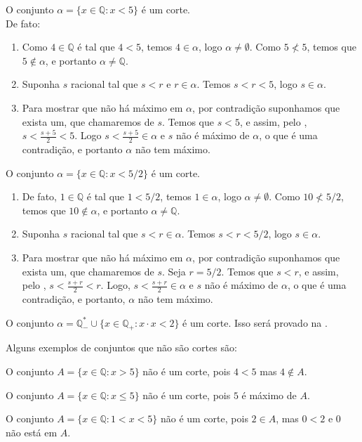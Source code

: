 \documentclass[../main.tex]{subfiles}
\begin{document}
\begin{ex}
    O conjunto $\alpha = \{ x \in \mathbb{Q} : x < 5 \}$ é um corte. \\
    De fato:
    \begin{enumerate}[label=(\roman*)]
        \item Como $4 \in \mathbb{Q}$ é tal que $4 < 5$, temos  $4 \in \alpha$, logo  $ \alpha \neq \emptyset$. Como $5 \not< 5$, temos que $5 \not\in \alpha$, e portanto $\alpha \neq \mathbb{Q}$.
        \item Suponha $s$ racional tal que $s < r$ e $r \in \alpha$. Temos $s < r < 5$, logo $s \in \alpha$.
        \item Para mostrar que não há máximo em $\alpha$, por contradição suponhamos que exista um, que chamaremos de $s$. Temos que $s < 5$, e assim, pelo , $s < \frac{s+5}{2} < 5$. Logo $s < \frac{s+5}{2} \in \alpha$ e $s$ não é máximo de $\alpha$, o que é uma contradição, e portanto $\alpha$ não tem máximo.
    \end{enumerate}
\end{ex}
\begin{ex}
    O conjunto $\alpha = \{ x \in \mathbb{Q} : x < 5/2 \}$ é um corte.
    \begin{enumerate}[label=(\roman*)]
        \item De fato, $1 \in \mathbb{Q}$ é tal que $1 < 5/2$, temos  $1 \in \alpha$, logo  $ \alpha \neq \emptyset$. Como $10 \not< 5/2$, temos que $10 \not\in \alpha$, e portanto $\alpha \neq \mathbb{Q}$.
        \item Suponha $s$ racional tal que $s < r \in \alpha$. Temos $s < r < 5/2$, logo $s \in \alpha$.
        \item Para mostrar que não há máximo em $\alpha$, por contradição suponhamos que exista um, que chamaremos de $s$. Seja $r = 5/2$. Temos que 
        $s < r$, e assim, pelo , $s < \frac{s+r}{2} < r$. Logo, $s < \frac{s+r}{2} \in \alpha$ e $s$ não é máximo de $\alpha$, o que é uma contradição, e portanto, $\alpha$ não tem máximo.
    \end{enumerate}
\end{ex}
\begin{ex}
    O conjunto $\alpha =  \mathbb{Q}_{-}^* \cup \{ x \in \mathbb{Q_{+}} : x \cdot x < 2 \} $ é um corte. Isso será provado na .
\end{ex}

Alguns exemplos de conjuntos que não são cortes são:
\begin{ex}
    O conjunto $A = \{ x \in \mathbb{Q} : x > 5 \}$ não é um corte, pois $4 < 5$ mas $4 \not\in A$.
\end{ex}
\begin{ex}
    O conjunto $A = \{ x \in \mathbb{Q} : x \leq 5 \}$ não é um corte, pois $5$ é máximo de $A$.
\end{ex}
\begin{ex}
    O conjunto $A = \{ x \in \mathbb{Q} : 1 < x < 5 \}$ não é um corte, pois $2 \in A$, mas $0 < 2$ e $0$ não está em $A$.
\end{ex}
\end{document}

